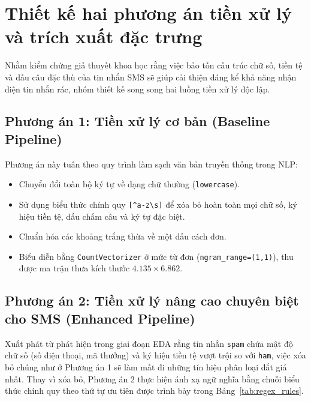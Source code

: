 \documentclass[12pt,a4paper]{report}
\begin{document}
\section{Thiết kế hai phương án tiền xử lý và trích xuất đặc trưng}
Nhằm kiểm chứng giả thuyết khoa học rằng việc bảo tồn cấu trúc chữ số, tiền tệ và dấu câu đặc thù của tin nhắn SMS sẽ giúp cải thiện đáng kể khả năng nhận diện tin nhắn rác, nhóm thiết kế song song hai luồng tiền xử lý độc lập.

\subsection{Phương án 1: Tiền xử lý cơ bản (Baseline Pipeline)}
Phương án này tuân theo quy trình làm sạch văn bản truyền thống trong NLP:
\begin{itemize}
    \item Chuyển đổi toàn bộ ký tự về dạng chữ thường (\texttt{lowercase}).
    \item Sử dụng biểu thức chính quy \texttt{[\^{}a-z\textbackslash s]} để xóa bỏ hoàn toàn mọi chữ số, ký hiệu tiền tệ, dấu chấm câu và ký tự đặc biệt.
    \item Chuẩn hóa các khoảng trắng thừa về một dấu cách đơn.
    \item Biểu diễn bằng \texttt{CountVectorizer} ở mức từ đơn (\texttt{ngram\_range=(1,1)}), thu được ma trận thưa kích thước $4.135 \times 6.862$.
\end{itemize}

\subsection{Phương án 2: Tiền xử lý nâng cao chuyên biệt cho SMS (Enhanced Pipeline)}
Xuất phát từ phát hiện trong giai đoạn EDA rằng tin nhắn \texttt{spam} chứa mật độ chữ số (số điện thoại, mã thưởng) và ký hiệu tiền tệ vượt trội so với \texttt{ham}, việc xóa bỏ chúng như ở Phương án 1 sẽ làm mất đi những tín hiệu phân loại đắt giá nhất. Thay vì xóa bỏ, Phương án 2 thực hiện ánh xạ ngữ nghĩa bằng chuỗi biểu thức chính quy theo thứ tự ưu tiên được trình bày trong Bảng~\ref{tab:regex_rules}.
\end{document}
